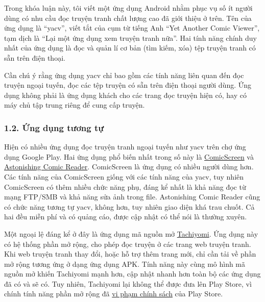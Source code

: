 \documentclass[
]{article}
\begin{document}
Trong khóa luận này, tôi viết một ứng dụng Android nhằm phục vụ số ít
người dùng có nhu cầu đọc truyện tranh chất lượng cao đã giới thiệu ở
trên. Tên của ứng dụng là ``yacv'', viết tắt của cụm từ tiếng Anh ``Yet
Another Comic Viewer'', tạm dịch là ``Lại một ứng dụng xem truyện tranh
nữa''. Hai tính năng chính duy nhất của ứng dụng là đọc và quản lí cơ
bản (tìm kiếm, xóa) tệp truyện tranh có sẵn trên điện thoại.

Cần chú ý rằng ứng dụng yacv chỉ bao gồm các tính năng liên quan đến đọc
truyện ngoại tuyến, đọc các tệp truyện có sẵn trên điện thoại người
dùng. Ứng dụng không phải là ứng dụng khách cho các trang đọc truyện
hiện có, hay có máy chủ tập trung riêng để cung cấp truyện.

\hypertarget{ux1ee9ng-dux1ee5ng-tux1b0ux1a1ng-tux1ef1}{%
\subsubsection{\texorpdfstring{1.2. Ứng dụng tương tự
}{1.2. Ứng dụng tương tự }}\label{ux1ee9ng-dux1ee5ng-tux1b0ux1a1ng-tux1ef1}}

Hiện có nhiều ứng dụng đọc truyện tranh ngoại tuyến như yacv trên chợ
ứng dụng Google Play. Hai ứng dụng phổ biến nhất trong số này là
\href{https://play.google.com/store/apps/details?id=com.viewer.comicscreen\&hl=en\&gl=US}{ComicScreen}
và
\href{https://play.google.com/store/apps/details?id=com.aerilys.acr.android\&hl=en\&gl=US}{Astonishing
Comic Reader}. ComicScreen là ứng dụng có nhiều người dùng hơn. Các tính
năng của ComicScreen giống với các tính năng của yacv, tuy nhiên
ComicScreen có thêm nhiều chức năng phụ, đáng kể nhất là khả năng đọc từ
mạng FTP/SMB và khả năng sửa ảnh trong file. Astonishing Comic Reader
cũng có chức năng tương tự yacv, không hơn, tuy nhiên giao diện khá trau
chuốt. Cả hai đều miễn phí và có quảng cáo, được cập nhật có thể nói là
thường xuyên.

Một ngoại lệ đáng kể ở đây là ứng dụng mã nguồn mở
\href{https://github.com/tachiyomiorg/tachiyomi}{Tachiyomi}. Ứng dụng
này có hệ thống phần mở rộng, cho phép đọc truyện ở các trang web truyện
tranh. Khi web truyện tranh thay đổi, hoặc hỗ trợ thêm trang mới, chỉ
cần tải về phần mở rộng tương ứng ở dạng ứng dụng APK. Tính năng này
cùng mô hình mã nguồn mở khiến Tachiyomi mạnh hơn, cập nhật nhanh hơn
toàn bộ các ứng dụng đã có và sẽ có. Tuy nhiên, Tachiyomi lại không thể
được đưa lên Play Store, vì chính tính năng phần mở rộng đã
\href{https://github.com/tachiyomiorg/tachiyomi/issues/1745}{vi phạm
chính sách} của Play Store.
\end{document}

